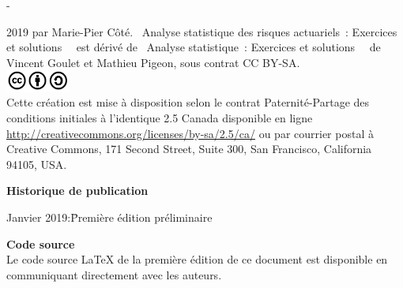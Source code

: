 \begingroup
\calccentering{\unitlength}
\begin{adjustwidth*}{\unitlength}{-\unitlength}
  \small
  \setlength{\parindent}{0pt}
  \setlength{\parskip}{\baselineskip}

  {\textcopyright} 2019 par Marie-Pier Côté. \og~Analyse statistique des risques actuariels~: Exercices et solutions~\fg~ est dérivé de \og~Analyse statistique~: Exercices et solutions~\fg~ de Vincent Goulet et Mathieu Pigeon, sous contrat CC BY-SA. \\


 \includegraphics[height=7mm,keepaspectratio=true]{cc-by-sa.jpg} \\  
  Cette création est mise à disposition selon le contrat
  Paternité-Partage des conditions initiales à l'identique 2.5 Canada
  disponible en ligne
  \url{http://creativecommons.org/licenses/by-sa/2.5/ca/} ou par
  courrier postal à Creative Commons, 171 Second Street, Suite 300,
  San Francisco, California 94105, USA.

  \textbf{Historique de publication}
  \vspace{-\baselineskip}
  \begin{tabbing}
    Janvier 2019:\quad\= Première édition préliminaire
  \end{tabbing}

  \textbf{Code source} \\
  Le code source {\LaTeX} de la première édition de ce document est disponible en communiquant directement avec les auteurs.

  \vspace{1cm}

\end{adjustwidth*}
\endgroup

\renewcommand{\sfdefault}{phv}

\clearpage


